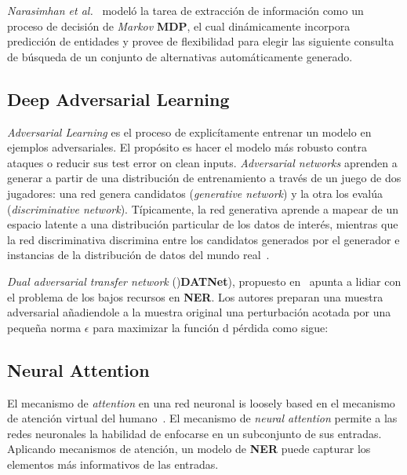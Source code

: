 \emph{Narasimhan et al.}~\cite{narasimhan2016improving} model\'o la tarea de extracci\'on de informaci\'on como un proceso de decisi\'on de \emph{Markov} \textbf{MDP}, el cual din\'amicamente incorpora predicci\'on de entidades y provee de flexibilidad para elegir las siguiente consulta de b\'usqueda de un conjunto de alternativas autom\'aticamente generado.

\subsection{Deep Adversarial Learning}

\emph{Adversarial Learning} es el proceso de explic\'itamente entrenar un modelo en ejemplos adversariales. El prop\'osito es hacer el modelo m\'as robusto contra ataques o reducir sus test error on clean inputs. \emph{Adversarial networks} aprenden a generar a partir de una distribuci\'on de entrenamiento a trav\'es de un juego de dos jugadores: una red genera candidatos (\emph{generative network}) y la otra los eval\'ua (\emph{discriminative network}). T\'ipicamente, la red generativa aprende a mapear de un espacio latente a una distribuci\'on particular de los datos de inter\'es, mientras que la red discriminativa discrimina entre los candidatos generados por el generador e instancias de la distribuci\'on de datos del mundo real~\cite{goodfellow2014generative}.

\emph{Dual adversarial transfer network} ()\textbf{DATNet}), propuesto en~\cite{zhou2018datnet} apunta a lidiar con el problema de los bajos recursos en \textbf{NER}. Los autores preparan una muestra adversarial a\~nadiendole a la muestra original una perturbaci\'on acotada por una peque\~na norma $\epsilon$ para maximizar la funci\'on d p\'erdida como sigue:




\subsection{Neural Attention}

El mecanismo de \emph{attention} en una red neuronal is loosely based en el mecanismo de atenci\'on virtual del humano~\cite{britz2016attention}. El mecanismo de \emph{neural attention} permite a las redes neuronales la habilidad de enfocarse en un subconjunto de sus entradas. Aplicando mecanismos de atenci\'on, un modelo de \textbf{NER} puede capturar los elementos m\'as informativos de las entradas.

